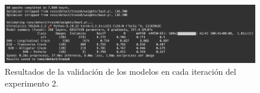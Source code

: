 \begin{figure}[H]
    \centering
    \includegraphics[width=\textwidth,height=\textheight,keepaspectratio]{../img/exp2-val-output.png}
    \caption{Resultados de la validación de los modelos en cada iteración del experimento 2.}
    \label{fig:exp2_val_output}
\end{figure}